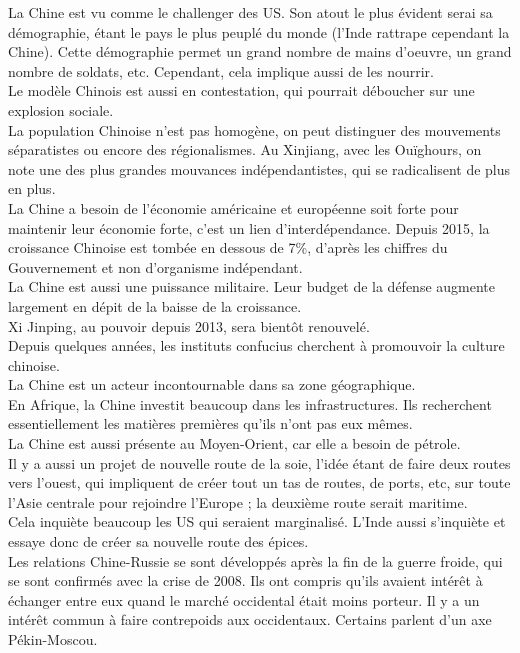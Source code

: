 \documentclass[10pt, a4paper, openany]{book}
\begin{document}
La Chine est vu comme le challenger des US. Son atout le plus évident serai sa démographie, étant le pays le plus peuplé du monde (l'Inde rattrape cependant la Chine). Cette démographie permet un grand nombre de mains d'oeuvre, un grand nombre de soldats, etc. Cependant, cela implique aussi de les nourrir. \\
Le modèle Chinois est aussi en contestation, qui pourrait déboucher sur une explosion sociale. \\
La population Chinoise n'est pas homogène, on peut distinguer des mouvements séparatistes ou encore des régionalismes. Au Xinjiang, avec les Ouïghours, on note une des plus grandes mouvances indépendantistes, qui se radicalisent de plus en plus. \\
La Chine a besoin de l'économie américaine et européenne soit forte pour maintenir leur économie forte, c'est un lien d'interdépendance. Depuis 2015, la croissance Chinoise est tombée en dessous de 7\%, d'après les chiffres du Gouvernement et  non d'organisme indépendant. \\
La Chine est aussi une puissance militaire. Leur budget de la défense augmente largement en dépit de la baisse de la croissance. \\
Xi Jinping, au pouvoir depuis 2013, sera bientôt renouvelé. \\
Depuis quelques années, les instituts confucius cherchent à promouvoir la culture chinoise. \\
La Chine est un acteur incontournable dans sa zone géographique. \\
En Afrique, la Chine investit beaucoup dans les infrastructures. Ils recherchent essentiellement les matières premières qu'ils n'ont pas eux mêmes. \\
La Chine est aussi présente au Moyen-Orient, car elle a besoin de pétrole. \\
Il y a aussi un projet de nouvelle route de la soie, l'idée étant de faire deux routes vers l'ouest, qui impliquent de créer tout un tas de routes, de ports, etc, sur toute l'Asie centrale pour rejoindre l'Europe ; la deuxième route serait maritime. \\
Cela inquiète beaucoup les US qui seraient marginalisé. L'Inde aussi s'inquiète et essaye donc de créer sa nouvelle route des épices. \\
Les relations Chine-Russie se sont développés après la fin de la guerre froide, qui se sont confirmés avec la crise de 2008. Ils ont compris qu'ils avaient intérêt à échanger entre eux quand le marché occidental était moins porteur. Il y a un intérêt commun à faire contrepoids aux occidentaux. Certains parlent d'un axe Pékin-Moscou. \\
\end{document}

